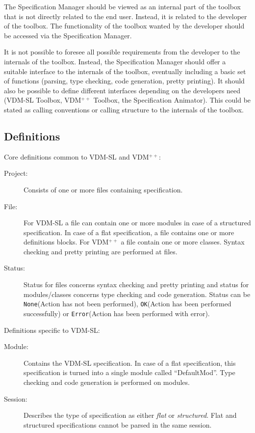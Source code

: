 \documentclass[11pt]{article}
\newcommand{\vdmpp}{{\small VDM}$^{++}$\/}
\newcommand{\vdmsl}{\small VDM-SL\/}
\newcommand{\specman} {Specification Manager}
\begin{document}
The \specman{} should be viewed as an internal part of the toolbox
that is not directly related to the end user. Instead, it is related
to the developer of the toolbox. The functionality of the toolbox
wanted by the developer should be accessed via the \specman{}. 

It is not possible to foresee all possible requirements from the
developer to the internals of the toolbox. Instead, the \specman{}
should offer a suitable interface to the internals of the toolbox,
eventually including a basic set of functions (parsing, type checking,
code generation, pretty printing). It should also be possible to
define different interfaces depending on the developers need (\vdmsl{}
Toolbox, \vdmpp{} Toolbox, the Specification Animator). This could be
stated as calling conventions or calling structure to the internals of
the toolbox. 

\subsection{Definitions} 
\label{sec:def}
Core definitions common to \vdmsl{} and \vdmpp{}:
\begin{description}
\item[Project:] Consists of one or more files containing
  specification. 
\item[File:] For \vdmsl{} a file can contain one or more modules in
  case of a structured specification. In case of a flat specification,
  a file contains one or more definitions blocks. For \vdmpp{} a file
  contain one or more classes. Syntax checking and pretty printing are
  performed at files.
\item[Status:] Status for files concerns syntax checking and pretty
  printing and status for modules/classes concerns type checking and code
  generation. Status can be \texttt{None}(Action has not been
  performed), \texttt{OK}(Action has been performed successfully) or
  \texttt{Error}(Action has been performed with error).
\end{description}

Definitions specific to \vdmsl{}:
\begin{description}
\item[Module:] Contains the \vdmsl{} specification. In case of a flat
  specification, this specification is turned into a single module
  called ``DefaultMod''. Type checking and code generation is
  performed on modules.
\item[Session:] Describes the type of specification as either
  \textit{flat} or \textit{structured}. Flat and structured
  specifications cannot be parsed in the same session. 
\end{description}
\end{document}
